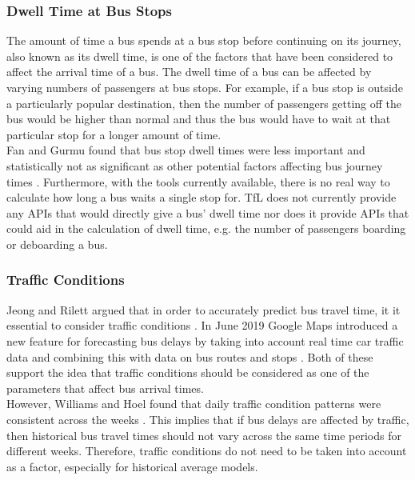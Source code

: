 \subsubsection{Dwell Time at Bus Stops}

The amount of time a bus spends at a bus stop before continuing on its journey, also known as its dwell time, is one of the factors that have been considered to affect the arrival time of a bus. The dwell time of a bus can be affected by varying numbers of passengers at bus stops. For example, if a bus stop is outside a particularly popular destination, then the number of passengers getting off the bus would be higher than normal and thus the bus would have to wait at that particular stop for a longer amount of time. \\

Fan and Gurmu found that bus stop dwell times were less important and statistically not as significant as other potential factors affecting bus journey times \cite{dynamic-gps}. Furthermore, with the tools currently available, there is no real way to calculate how long a bus waits a single stop for. TfL does not currently provide any APIs that would directly give a bus' dwell time nor does it provide APIs that could aid in the calculation of dwell time, e.g. the number of passengers boarding or deboarding a bus. 

\subsubsection{Traffic Conditions}

Jeong and Rilett argued that in order to accurately predict bus travel time, it it essential to consider traffic conditions \cite{ann-prediction}. In June 2019 Google Maps introduced a new feature for forecasting bus delays by taking into account real time car traffic data and combining this with data on bus routes and stops \cite{google-machine-learning}. Both of these support the idea that traffic conditions should be considered as one of the parameters that affect bus arrival times. \\

However, Williams and Hoel found that daily traffic condition patterns were consistent across the weeks \cite{consistent-traffic}. This implies that if bus delays are affected by traffic, then historical bus travel times should not vary across the same time periods for different weeks. Therefore, traffic conditions do not need to be taken into account as a factor, especially for historical average models. \\

